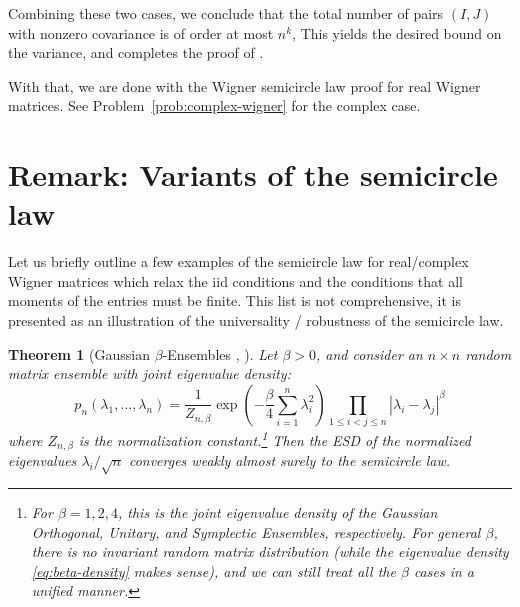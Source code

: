\documentclass[letterpaper,11pt,oneside,reqno]{article}
\numberwithin{equation}{section}
\newtheorem{theorem}[proposition]{Theorem}
\theoremstyle{definition}
\begin{document}
Combining these two cases, we conclude that the total number of pairs \((I,J)\) with nonzero covariance is of order at most \(n^k\),
This yields the desired bound on the variance, and completes the proof of .

With that, we are done with the Wigner semicircle law proof for real
Wigner matrices.  See Problem~\ref{prob:complex-wigner} for the complex case.

\section{Remark: Variants of the semicircle law}

Let us briefly outline a few examples
of the semicircle law for real/complex
Wigner matrices which relax the iid conditions and the
conditions that all moments of the entries must be finite.
This list is not comprehensive, it is presented as an illustration of the
universality / robustness of the semicircle law.
\begin{theorem}[Gaussian $\beta$-Ensembles \cite{Johansson_BGG_1998}, \cite{Forrester-LogGas}]
	Let $\beta > 0$, and consider an $n \times n$ random matrix ensemble with joint eigenvalue density:
\begin{equation}
	\label{eq:beta-density}
	p_n(\lambda_1,\ldots,\lambda_n) = \frac{1}{Z_{n,\beta}} \exp\left(-\frac{\beta}{4}\sum_{i=1}^n \lambda_i^2\right) \prod_{1\leq i<j\leq n} |\lambda_i-\lambda_j|^\beta
\end{equation}
where $Z_{n,\beta}$ is the normalization constant.\footnote{For
	$\beta=1,2,4$, this is the joint
eigenvalue density of the Gaussian Orthogonal, Unitary, and Symplectic Ensembles, respectively.
For general $\beta$, there is no invariant random matrix distribution
(while the eigenvalue density \eqref{eq:beta-density} makes sense), and
we can still treat all the $\beta$ cases in a unified manner.}
Then the ESD of the normalized eigenvalues $\lambda_i/\sqrt n$
converges weakly almost surely to the semicircle law.
\end{theorem}
\end{document}
